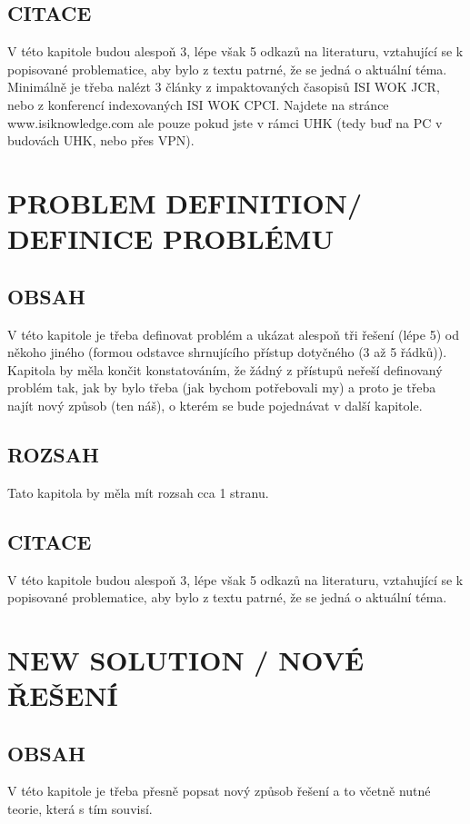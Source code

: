 \documentclass[journal]{IEEEtran}
\begin{document}
\subsection{CITACE}
V této kapitole budou alespoň 3, lépe však 5 odkazů na literaturu, vztahující se k popisované problematice, aby bylo z textu patrné, že se jedná o aktuální téma.
Minimálně je třeba nalézt 3 články z impaktovaných časopisů ISI WOK JCR, nebo z konferencí indexovaných ISI WOK CPCI. Najdete na stránce www.isiknowledge.com ale pouze pokud jste v rámci UHK (tedy buď na PC v budovách UHK, nebo přes VPN).



\section{PROBLEM DEFINITION/ DEFINICE PROBLÉMU}
\subsection{OBSAH}
V této kapitole je třeba definovat problém a ukázat alespoň tři řešení (lépe 5) od někoho jiného (formou odstavce shrnujícího přístup dotyčného (3 až 5 řádků)). Kapitola by měla končit konstatováním, že žádný z přístupů neřeší definovaný problém tak, jak by bylo třeba (jak bychom potřebovali my) a proto je třeba najít nový způsob (ten náš), o kterém se bude pojednávat v další kapitole.
\subsection{ROZSAH}
Tato kapitola by měla mít rozsah cca 1 stranu.
\subsection{CITACE}
V této kapitole budou alespoň 3, lépe však 5 odkazů na literaturu, vztahující se k popisované problematice, aby bylo z textu patrné, že se jedná o aktuální téma.




\section{NEW SOLUTION / NOVÉ ŘEŠENÍ}

\subsection{OBSAH}
V této kapitole je třeba přesně popsat nový způsob řešení a to včetně nutné teorie, která s tím souvisí. 
\end{document}
